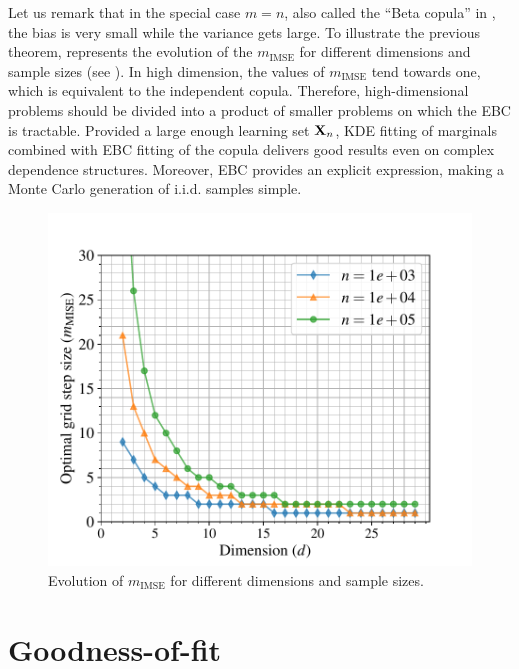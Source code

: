 Let us remark that in the special case $m = n$, also called the ``Beta copula'' in \cite{segers_2017}, the bias is very small while the variance gets large. 
To illustrate the previous theorem, \cite{lasserre_2022} represents the evolution of the $m_{\mathrm{IMSE}}$ for different dimensions and sample sizes (see ). 
In high dimension, the values of $m_{\mathrm{IMSE}}$ tend towards one, which is equivalent to the independent copula. 
Therefore, high-dimensional problems should be divided into a product of smaller problems on which the EBC is tractable. 
Provided a large enough learning set ${\bf X}_n$, KDE fitting of marginals combined with EBC fitting of the copula delivers good results even on complex dependence structures. 
Moreover, EBC provides an explicit expression, making a Monte Carlo generation of i.i.d. samples simple. 

\begin{figure}
    \centering
    \includegraphics[width=0.6\linewidth]{part3/figures/BANCS/hMISE.pdf}
    \caption{Evolution of $m_{\mathrm{IMSE}}$ for different dimensions and sample sizes.}
    \label{fig:hmise}
\end{figure}


\section{Goodness-of-fit}



